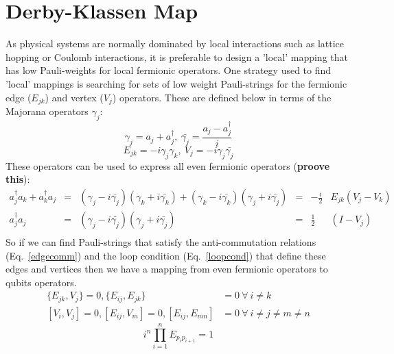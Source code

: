 \documentclass[twoside]{article}
\begin{document}
\section{Derby-Klassen Map}\label{derby-klassen_section}
As physical systems are normally dominated by local interactions such as lattice hopping or Coulomb interactions, it is preferable to design a 'local' mapping that has low Pauli-weights for local fermionic operators. One strategy used to find 'local' mappings is searching for sets of low weight Pauli-strings for the fermionic edge ($E_{jk}$) and vertex ($V_j$) operators. These are defined below in terms of the Majorana operators $\gamma_j$:
\begin{equation}
\gamma_j = a_j + a^{\dagger}_j, \> \bar{\gamma_j} = \frac{a_j - a_j^{\dagger}}{i}
\end{equation}
\begin{equation}
        E_{jk} = - i \gamma_j \gamma_k, \> V_j = - i \gamma_j \bar{\gamma_j}
\end{equation}
These operators can be used to express all even fermionic operators \cite{superfast} (\textbf{proove this}):
\begin{equation}
        \begin{align}
                a_j^{\dagger} a_k + a_k^{\dagger} a_j &=& (\gamma_j - i \bar{\gamma_j}) (\gamma_k + i \bar{\gamma_k})  + (\gamma_k - i \bar{\gamma_k}) (\gamma_j + i \bar{\gamma_j}) &=& -\frac{i}{2}& E_{jk} (V_j - V_k)\\
                a_j^{\dagger} a_j &=& (\gamma_j - i \bar{\gamma_j}) (\gamma_j + i \bar{\gamma_j}) &=&  \frac{1}{2}& (I - V_j)\\
\end{align}
\end{equation}
So if we can find Pauli-strings that satisfy the anti-commutation relations (Eq.~\ref{edgecomm}) \cite{derbyklassen} and the loop condition (Eq.~\ref{loopcond}) that define these edges and vertices then we have a mapping from even fermionic operators to qubits operators. 
\begin{equation}
        \label{edgecomm}
        \begin{align}
                \{ E_{jk}, V_j\} = 0, \{ E_{ij}, E_{jk} \} &= 0 \> \forall \>i \neq k\\
                [V_i, V_j] =0, [E_{ij}, V_m] = 0, [E_{ij}, E_{mn}] &= 0 \>\forall \>i \neq j \neq m \neq n
\end{align}
\end{equation}
\begin{equation}
        \label{loopcond}
        i^{n} \prod_{i=1}^{n} E_{p_i p_{i+1}} = 1
        \end{equation}
\end{document}
